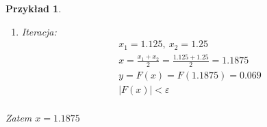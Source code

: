 \documentclass[12pt]{article}
\newtheorem{example}{Przykład}
\begin{document}
\begin{example}
\begin{enumerate}
    \item Iteracja:\\
    \begin{align*}
        &x_1=1.125,\ x_2=1.25\\
        &x=\frac{x_1+x_2}{2}=\frac{1.125+1.25}{2}=1.1875\\
        &y=F(x)=F(1.1875)=0.069\\
        &|F(x)|<\varepsilon\\
    \end{align*}
\end{enumerate}

Zatem $x=1.1875$
\end{example}
\end{document}
